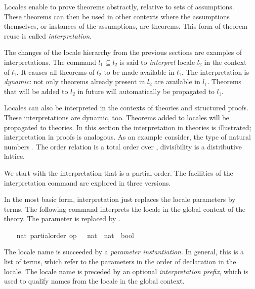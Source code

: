 %
\begin{isabellebody}%
\def\isabellecontext{Examples{\isadigit{1}}}%
%
\isadelimtheory
%
\endisadelimtheory
%
\isatagtheory
%
\endisatagtheory
{\isafoldtheory}%
%
\isadelimtheory
%
\endisadelimtheory
%
\isamarkuptrue%
%
\begin{isamarkuptext}%
Locales enable to prove theorems abstractly, relative to
  sets of assumptions.  These theorems can then be used in other
  contexts where the assumptions themselves, or
  instances of the assumptions, are theorems.  This form of theorem
  reuse is called \emph{interpretation}.

  The changes of the locale
  hierarchy from the previous sections are examples of
  interpretations.  The command  $l_1
  \subseteq l_2$ is said to \emph{interpret} locale $l_2$ in the
  context of $l_1$.  It causes all theorems of $l_2$ to be made
  available in $l_1$.  The interpretation is \emph{dynamic}: not only
  theorems already present in $l_2$ are available in $l_1$.  Theorems
  that will be added to $l_2$ in future will automatically be
  propagated to $l_1$.

  Locales can also be interpreted in the contexts of theories and
  structured proofs.  These interpretations are dynamic, too.
  Theorems added to locales will be propagated to theories.
  In this section the interpretation in
  theories is illustrated; interpretation in proofs is analogous.
  As an example consider, the type of natural numbers .  The
  order relation \isa{{\isasymle}} is a total order over ,
  divisibility  is a distributive lattice.

  We start with the
  interpretation that \isa{{\isasymle}} is a partial order.  The facilities of
  the interpretation command are explored in three versions.%
\end{isamarkuptext}%
\isamarkuptrue%
%
\isamarkuptrue%
%
\begin{isamarkuptext}%
In the most basic form, interpretation just replaces the locale
  parameters by terms.  The following command interprets the locale
   in the global context of the theory.  The
  parameter  is replaced by .%
\end{isamarkuptext}%
\isamarkuptrue%
%
\isadelimvisible
\ \ %
\endisadelimvisible
%
\isatagvisible
{}\isamarkupfalse%
\ nat{\isacharcolon}\ partial{\isacharunderscore}order\ {\isacharbrackleft}{\isachardoublequoteopen}op\ {\isasymle}\ {\isacharcolon}{\isacharcolon}\ nat\ {\isasymRightarrow}\ nat\ {\isasymRightarrow}\ bool{\isachardoublequoteclose}{\isacharbrackright}%
\begin{isamarkuptxt}%
The locale name is succeeded by a \emph{parameter
  instantiation}.  In general, this is a list of terms, which refer to
  the parameters in the order of declaration in the locale.  The
  locale name is preceded by an optional \emph{interpretation prefix},
  which is used to qualify names from the locale in the global
  context.


\end{isamarkuptxt}
\end{isabellebody}
